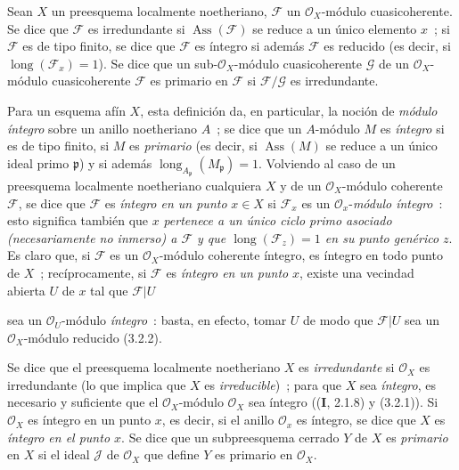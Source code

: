 \begin{definition}[3.2.4]
\label{IV.2.3.2.4-fr}
Sean $X$ un preesquema localmente noetheriano, $\mathcal F$ un
$\mathcal O_X$-módulo cuasicoherente. Se dice que $\mathcal F$ es
irredundante si $\operatorname{Ass}(\mathcal F)$ se reduce a un único
elemento $x$~; si $\mathcal F$ es de tipo finito, se dice que $\mathcal F$ es
íntegro si además $\mathcal F$ es reducido \textup{(es decir, si
$\operatorname{long}(\mathcal F_x)=1$)}. Se dice que un sub-$\mathcal O_X$-módulo
cuasicoherente $\mathcal G$ de un $\mathcal O_X$-módulo cuasicoherente
$\mathcal F$ es primario en $\mathcal F$ si
$\mathcal F/\mathcal G$ es irredundante.
\end{definition}

Para un esquema afín $X$, esta definición da, en particular, la noción de
\emph{módulo íntegro} sobre un anillo noetheriano $A$~; se dice que un
$A$-módulo $M$ es \emph{íntegro} si es de tipo finito, si $M$ es
\emph{primario} (es decir, si $\operatorname{Ass}(M)$ se reduce a un único
ideal primo $\mathfrak p$) y si además
$\operatorname{long}_{A_\mathfrak p}(M_\mathfrak p)=1$. Volviendo al caso de un
preesquema localmente noetheriano cualquiera $X$ y de un
$\mathcal O_X$-módulo coherente $\mathcal F$, se dice que $\mathcal F$ es
\emph{íntegro en un punto} $x\in X$ si $\mathcal F_x$ es un
$\mathcal O_x$-\emph{módulo íntegro}~: esto significa también que $x$
\emph{pertenece a un único ciclo primo asociado (necesariamente no
inmerso) a $\mathcal F$ y que $\operatorname{long}(\mathcal F_z)=1$ en su
punto genérico $z$}. Es claro que, si $\mathcal F$ es un
$\mathcal O_X$-módulo coherente íntegro, es íntegro en todo punto de $X$~;
recíprocamente, si $\mathcal F$ es \emph{íntegro en un punto} $x$, existe una
vecindad abierta $U$ de $x$ tal que $\mathcal F|U$

sea un $\mathcal O_U$-módulo \emph{íntegro}~: basta, en efecto, tomar
$U$ de modo que $\mathcal F|U$ sea un $\mathcal O_X$-módulo reducido (3.2.2).

Se dice que el preesquema localmente noetheriano $X$ es \emph{irredundante} si
$\mathcal O_X$ es irredundante (lo que implica que $X$ es
\emph{irreducible})~; para que $X$ sea \emph{íntegro}, es necesario y suficiente
que el $\mathcal O_X$-módulo $\mathcal O_X$ sea íntegro ((\textbf I, 2.1.8) y
(3.2.1)). Si $\mathcal O_X$ es íntegro en un punto $x$, es decir, si
el anillo $\mathcal O_x$ es íntegro, se dice que $X$ es \emph{íntegro en el
punto $x$}. Se dice que un subpreesquema cerrado $Y$ de $X$ es \emph{primario}
en $X$ si el ideal $\mathcal J$ de $\mathcal O_X$ que define $Y$ es primario
en $\mathcal O_X$.
